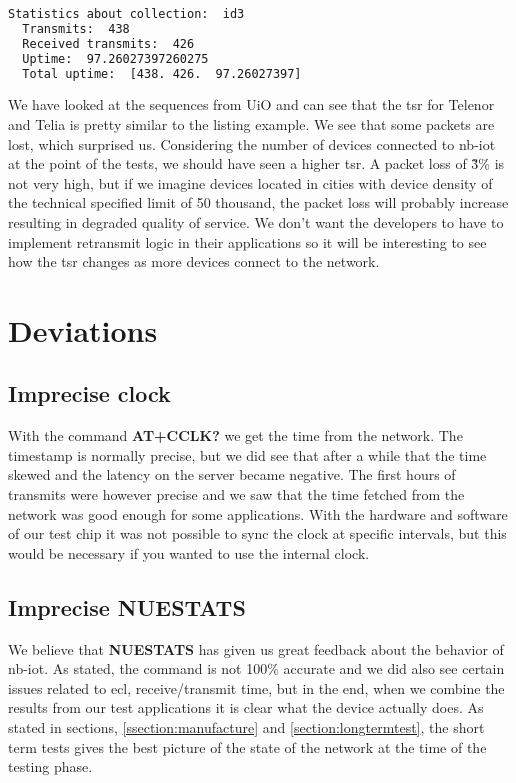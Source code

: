 \documentclass[USenglish]{ifimaster}  %
\begin{document}
\begin{lstlisting}[caption={uptime.py example}, label={code:uptimerun}, language=Bash]
  Statistics about collection:  id3
  Transmits:  438
  Received transmits:  426
  Uptime:  97.26027397260275
  Total uptime:  [438. 426.  97.26027397]
\end{lstlisting}

We have looked at the sequences from UiO and can see that the \acrshort{tsr} for Telenor and Telia is pretty similar to the listing example. We see that some packets are lost, which surprised us. Considering the number of devices connected to \acrshort{nb-iot} at the point of the tests, we should have seen a higher \acrshort{tsr}. A packet loss of \~3\% is not very high, but if we imagine devices located in cities with device density of the technical specified limit of 50 thousand, the packet loss will probably increase resulting in degraded quality of service. We don't want the developers to have to implement retransmit logic in their applications so it will be interesting to see how the \acrshort{tsr} changes as more devices connect to the network.

\section{Deviations} \label{section:deviations}
\subsection{Imprecise clock}
With the command \textbf{AT+CCLK?} we get the time from the network. The timestamp is normally precise, but we did see that after a while that the time skewed and the latency on the server became negative. The first hours of transmits were however precise and we saw that the time fetched from the network was good enough for some applications. With the hardware and software of our test chip it was not possible to sync the clock at specific intervals, but this would be necessary if you wanted to use the internal clock.

\subsection{Imprecise \textbf{NUESTATS}}
We believe that \textbf{NUESTATS} has given us great feedback about the behavior of \acrshort{nb-iot}. As stated, the command is not 100\% accurate and we did also see certain issues related to \acrshort{ecl}, receive/transmit time, but in the end, when we combine the results from our test applications it is clear what the device actually does. As stated in sections, \vref{ssection:manufacture} and \vref{section:longtermtest}, the short term tests gives the best picture of the state of the network at the time of the testing phase.
\end{document}
